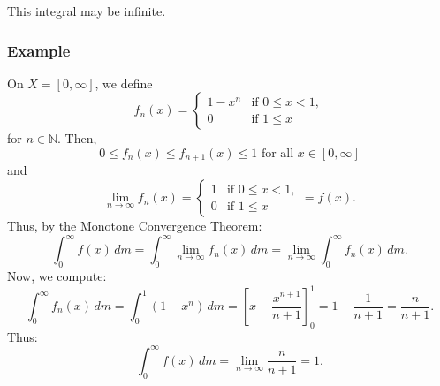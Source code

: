\documentclass[11pt]{article}
\begin{document}
This integral may be infinite.

\subsubsection*{Example}
On \(X = [0, \infty]\), we define
\[f_n(x) = \begin{cases}
    1 - x^n & \text{if } 0 \leq x < 1, \\
    0 & \text{if } 1 \leq x 
\end{cases}\]
for \(n \in \mathbb{N}\). Then, 
\[0 \leq f_n(x) \leq f_{n+1}(x) \leq 1 \text{ for all } x \in [0, \infty]\]
and
\[\lim_{n \to \infty} f_n(x) = \begin{cases}
    1 & \text{if } 0 \leq x < 1, \\
    0 & \text{if } 1 \leq x 
\end{cases} = f(x).\]
Thus, by the Monotone Convergence Theorem:
\[\int_0^{\infty} f(x) \,dm = \int_0^{\infty} \lim_{n \to \infty} f_n(x) \,dm = \lim_{n \to \infty} \int_0^{\infty} f_n(x) \,dm.\]
Now, we compute:
\[\int_0^{\infty} f_n(x) \,dm = \int_0^1 (1 - x^n) \,dm = \left[x - \frac{x^{n+1}}{n+1}\right]_0^1 = 1 - \frac{1}{n+1} = \frac{n}{n+1}.\]
Thus:
\[\int_0^{\infty} f(x) \,dm = \lim_{n \to \infty} \frac{n}{n+1} = 1.\]  

\begin{center}
\end{center}
\end{document}
